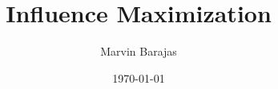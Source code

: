 \documentclass{article}
\title{Influence Maximization}
\author{Marvin Barajas}
\date{\today}			%
\begin{document}
\maketitle			%



\begin{thebibliography}{99}	%


\cite{9695654} 
\cite{9188557}
\cite{9045797}
\cite{10000698}
\cite{9668587}
\cite{10035644}
\cite{10053447}
\cite{8681423}
\cite{9744500}
\cite{10072595}
\cite{8855546}
\cite{9169627}
\cite{9929315}
\cite{9721514}
\cite{8727988}
\end{thebibliography}
\end{document}

